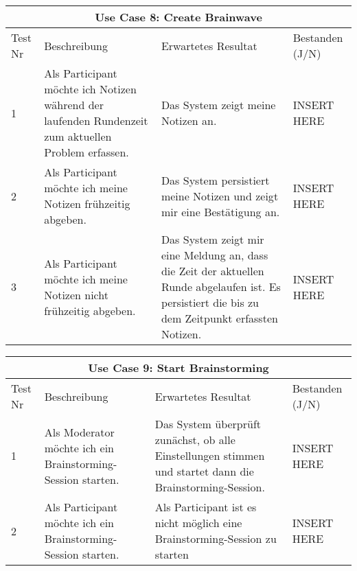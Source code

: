 \renewcommand{\arraystretch}{1.35}
\begin{center}
	\begin{longtable}{| p{1cm} | p{5cm} | p{5cm} | p{2cm} |}
		\hline
		\multicolumn{4}{|c|}{\textbf{Use Case 8: Create Brainwave}}\\
		\hline\hline
		Test Nr & Beschreibung & Erwartetes Resultat & Bestanden (J/N) \\
		\hline
		1 & Als Participant möchte ich Notizen während der laufenden Rundenzeit zum aktuellen Problem erfassen. & Das System zeigt meine Notizen an. & INSERT HERE \\
		\hline
		2 & Als Participant möchte ich meine Notizen frühzeitig abgeben. & Das System persistiert meine Notizen und zeigt mir eine Bestätigung an. & INSERT HERE\\
		\hline
		3 & Als Participant möchte ich meine Notizen nicht frühzeitig abgeben. & Das System zeigt mir eine Meldung an, dass die Zeit der aktuellen Runde abgelaufen ist. Es persistiert die bis zu dem Zeitpunkt erfassten Notizen. & INSERT HERE\\
		\hline
	\end{longtable}
\end{center}

\renewcommand{\arraystretch}{1.35}
\begin{center}
	\begin{longtable}{| p{1cm} | p{5cm} | p{5cm} | p{2cm} |}
		\hline
		\multicolumn{4}{|c|}{\textbf{Use Case 9: Start Brainstorming}}\\
		\hline\hline
		Test Nr & Beschreibung & Erwartetes Resultat & Bestanden (J/N) \\
		\hline
		1 & Als Moderator möchte ich ein Brainstorming-Session starten. & Das System überprüft zunächst, ob alle Einstellungen stimmen und startet dann die Brainstorming-Session. & INSERT HERE \\
		\hline
		2 & Als Participant möchte ich ein Brainstorming-Session starten. & Als Participant ist es nicht möglich eine Brainstorming-Session zu starten & INSERT HERE\\
		\hline
	\end{longtable}
\end{center}
